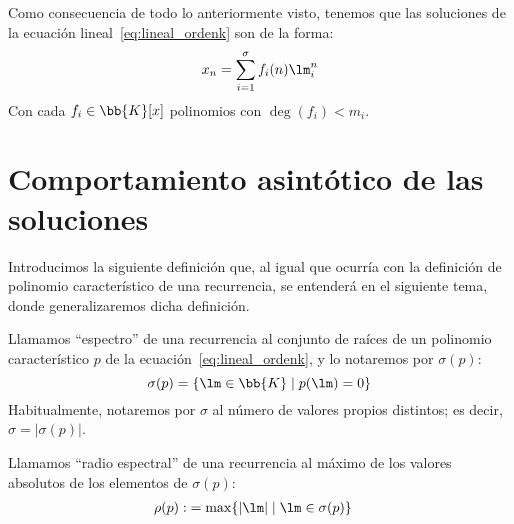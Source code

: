 Como consecuencia de todo lo anteriormente visto, tenemos que las soluciones de la ecuación lineal~\ref{eq:lineal_ordenk} son de la forma:
\begin{equation*}
    x_n = \sum_{i=1}^\sigma f_i(n) \lm_i^n
\end{equation*}
Con cada $f_i\in \bb{K}[x]$ polinomios con $\deg(f_i)< m_i$.

\begin{comment}    
Como consecuencia, si los coeficientes $a_i$ de~\ref{eq:lineal_ordenk} son reales y existe algún \newline${\lm_t = \rho_t(\cos\theta_t + i\sen\theta_t) \in \bb{C}\setminus\bb{R}}$, entonces tenemos que $f_t(n)\cos(n\theta_t)\rho_t^n$ y\newline $f_t(n)\sen(n\theta_t)\rho_t^n$ son soluciones de la ecuación homogénea.
\end{comment}

\section{Comportamiento asintótico de las soluciones}
Introducimos la siguiente definición que, al igual que ocurría con la definición de polinomio característico de una recurrencia, se entenderá en el siguiente tema, donde generalizaremos dicha definición.
\begin{definicion}[Espectro]
    Llamamos ``espectro'' de una recurrencia al conjunto de raíces de un polinomio característico $p$ de la ecuación~\ref{eq:lineal_ordenk}, y lo notaremos por $\sigma(p)$:
    \begin{equation*}
        \sigma(p) = \{\lm \in \bb{K} \mid p(\lm) = 0\}
    \end{equation*}
    Habitualmente, notaremos por $\sigma$ al número de valores propios distintos; es decir, $\sigma=|\sigma(p)|$.
\end{definicion}
\begin{definicion}
    Llamamos ``radio espectral'' de una recurrencia
    al máximo de los valores absolutos de los elementos de $\sigma(p)$:
    \begin{align*}
        \rho(p) :&= \max\{|\lm|\mid \lm\in \sigma(p)\}
    \end{align*}
\end{definicion}

